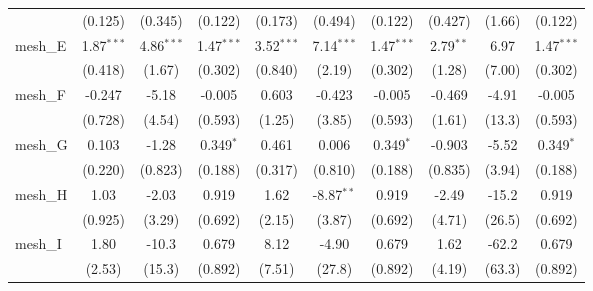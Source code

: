 \begin{tabular}{lccccccccc}
                                                               & (0.125)       & (0.345)       & (0.122)        & (0.173)       & (0.494)      & (0.122)        & (0.427)      & (1.66)       & (0.122)\\   
   mesh\_E                                                     & 1.87$^{***}$  & 4.86$^{***}$  & 1.47$^{***}$   & 3.52$^{***}$  & 7.14$^{***}$ & 1.47$^{***}$   & 2.79$^{**}$  & 6.97         & 1.47$^{***}$\\   
                                                               & (0.418)       & (1.67)        & (0.302)        & (0.840)       & (2.19)       & (0.302)        & (1.28)       & (7.00)       & (0.302)\\   
   mesh\_F                                                     & -0.247        & -5.18         & -0.005         & 0.603         & -0.423       & -0.005         & -0.469       & -4.91        & -0.005\\   
                                                               & (0.728)       & (4.54)        & (0.593)        & (1.25)        & (3.85)       & (0.593)        & (1.61)       & (13.3)       & (0.593)\\   
   mesh\_G                                                     & 0.103         & -1.28         & 0.349$^{*}$    & 0.461         & 0.006        & 0.349$^{*}$    & -0.903       & -5.52        & 0.349$^{*}$\\   
                                                               & (0.220)       & (0.823)       & (0.188)        & (0.317)       & (0.810)      & (0.188)        & (0.835)      & (3.94)       & (0.188)\\   
   mesh\_H                                                     & 1.03          & -2.03         & 0.919          & 1.62          & -8.87$^{**}$ & 0.919          & -2.49        & -15.2        & 0.919\\   
                                                               & (0.925)       & (3.29)        & (0.692)        & (2.15)        & (3.87)       & (0.692)        & (4.71)       & (26.5)       & (0.692)\\   
   mesh\_I                                                     & 1.80          & -10.3         & 0.679          & 8.12          & -4.90        & 0.679          & 1.62         & -62.2        & 0.679\\   
                                                               & (2.53)        & (15.3)        & (0.892)        & (7.51)        & (27.8)       & (0.892)        & (4.19)       & (63.3)       & (0.892)\\   

\end{tabular}
